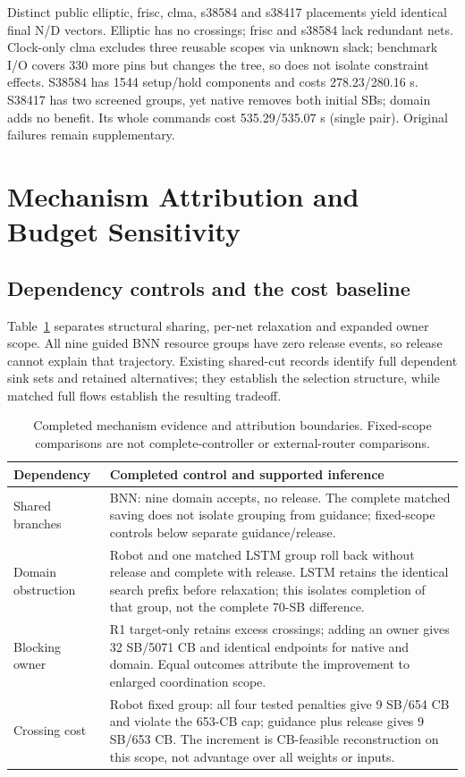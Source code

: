 \documentclass[conference,10pt]{IEEEtran}
\begin{document}
Distinct public elliptic, frisc, clma, s38584 and s38417 placements yield identical final N/D vectors. Elliptic has no crossings; frisc and s38584 lack redundant nets. Clock-only clma excludes three reusable scopes via unknown slack; benchmark I/O covers 330 more pins but changes the tree, so does not isolate constraint effects. S38584 has 1544 setup/hold components and costs 278.23/280.16 s. S38417 has two screened groups, yet native removes both initial SBs; domain adds no benefit. Its whole commands cost 535.29/535.07 s (single pair). Original failures remain supplementary.

\section{Mechanism Attribution and Budget Sensitivity}
\subsection{Dependency controls and the cost baseline}
Table~\ref{tab:attribution} separates structural sharing, per-net relaxation and expanded owner scope. All nine guided BNN resource groups have zero release events, so release cannot explain that trajectory. Existing shared-cut records identify full dependent sink sets and retained alternatives; they establish the selection structure, while matched full flows establish the resulting tradeoff.

\begin{table}[t]
\centering\footnotesize\setlength{\tabcolsep}{3pt}
\caption{Completed mechanism evidence and attribution boundaries. Fixed-scope comparisons are not complete-controller or external-router comparisons.}
\label{tab:attribution}
\begin{tabular}{p{}p{}}\hline
Dependency & Completed control and supported inference\\\hline
Shared branches & BNN: nine domain accepts, no release. The complete matched saving does not isolate grouping from guidance; fixed-scope controls below separate guidance/release.\\
Domain obstruction & Robot and one matched LSTM group roll back without release and complete with release. LSTM retains the identical search prefix before relaxation; this isolates completion of that group, not the complete 70-SB difference.\\
Blocking owner & R1 target-only retains excess crossings; adding an owner gives 32 SB/5071 CB and identical endpoints for native and domain. Equal outcomes attribute the improvement to enlarged coordination scope.\\
Crossing cost & Robot fixed group: all four tested penalties give 9 SB/654 CB and violate the 653-CB cap; guidance plus release gives 9 SB/653 CB. The increment is CB-feasible reconstruction on this scope, not advantage over all weights or inputs.\\\hline
\end{tabular}
\end{table}
\end{document}
